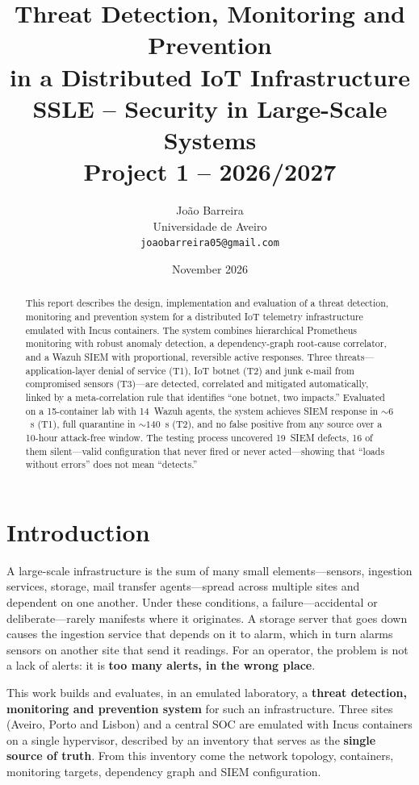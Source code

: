\documentclass[11pt,a4paper]{article}
\title{%
  \vspace{-1cm}
  \textbf{Threat Detection, Monitoring and Prevention\\in a Distributed IoT Infrastructure}\\[0.5em]
  \large SSLE -- Security in Large-Scale Systems\\
  Project 1 -- 2026/2027
}
\author{João Barreira\\
  \small Universidade de Aveiro\\
  \small \texttt{joaobarreira05@gmail.com}
}
\date{November 2026}
\begin{document}
\maketitle

\begin{abstract}
This report describes the design, implementation and evaluation of a threat detection,
monitoring and prevention system for a distributed IoT telemetry infrastructure emulated
with Incus containers. The system combines hierarchical Prometheus monitoring with robust
anomaly detection, a dependency-graph root-cause correlator, and a Wazuh SIEM with
proportional, reversible active responses. Three threats---application-layer denial of
service (T1), IoT botnet (T2) and junk e-mail from compromised sensors (T3)---are detected,
correlated and mitigated automatically, linked by a meta-correlation rule that identifies
``one botnet, two impacts.'' Evaluated on a 15-container lab with 14~Wazuh agents, the
system achieves SIEM response in ${\sim}6$~s (T1), full quarantine in ${\sim}140$~s (T2),
and no false positive from any source over a 10-hour attack-free window. The testing process uncovered 19~SIEM defects, 16 of them
silent---valid configuration that never fired or never acted---showing that ``loads without
errors'' does not mean ``detects.''
\end{abstract}

\newpage
\tableofcontents
\newpage

\section{Introduction}
\label{sec:introduction}

A large-scale infrastructure is the sum of many small elements---sensors, ingestion services,
storage, mail transfer agents---spread across multiple sites and dependent on one another.
Under these conditions, a failure---accidental or deliberate---rarely manifests where it
originates. A storage server that goes down causes the ingestion service that depends on it
to alarm, which in turn alarms sensors on another site that send it readings. For an
operator, the problem is not a lack of alerts: it is \textbf{too many alerts, in the wrong
place}.

This work builds and evaluates, in an emulated laboratory, a \textbf{threat detection,
monitoring and prevention system} for such an infrastructure. Three sites
(Aveiro, Porto and Lisbon) and a central SOC are emulated with Incus containers on a single
hypervisor, described by an inventory that serves as the \textbf{single source of truth}.
From this inventory come the network topology, containers, monitoring targets, dependency
graph and SIEM configuration.
\end{document}
